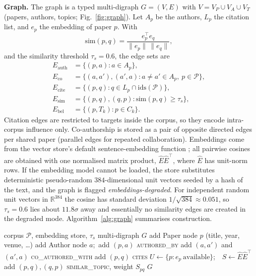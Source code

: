 \documentclass[conference]{IEEEtran}
\newcommand{\cP}{\mathcal{P}}
\begin{document}
\textbf{Graph.} The graph is a typed multi-digraph $G=(V,E)$ with $V=V_P\cup V_A\cup V_T$ (papers, authors, topics; Fig.~\ref{fig:graph}). Let $A_p$ be the authors, $L_p$ the citation list, and $e_p$ the embedding of paper $p$. With
\begin{equation}
\mathrm{sim}(p,q)=\frac{e_p^{\top}e_q}{\lVert e_p\rVert\,\lVert e_q\rVert},
\label{eq:cos}
\end{equation}
and the similarity threshold $\tau_s=0.6$, the edge sets are
\begin{align}
E_{\mathrm{auth}}&=\{(p,a):a\in A_p\},\nonumber\\
E_{\mathrm{co}}&=\{(a,a'),(a',a):a\neq a'\in A_p,\ p\in\cP\},\nonumber\\
E_{\mathrm{cite}}&=\{(p,q):q\in L_p\cap\mathrm{ids}(\cP)\},\nonumber\\
E_{\mathrm{sim}}&=\{(p,q),(q,p):\mathrm{sim}(p,q)\ge\tau_s\},\nonumber\\
E_{\mathrm{bel}}&=\{(p,T_k):p\in C_k\}.
\label{eq:edges}
\end{align}
Citation edges are restricted to targets inside the corpus, so they encode intra-corpus influence only. Co-authorship is stored as a pair of opposite directed edges per shared paper (parallel edges for repeated collaboration). Embeddings come from the vector store's default sentence-embedding function \cite{reimers2019sbert}; all pairwise cosines are obtained with one normalised matrix product, $\hat E\hat E^{\top}$, where $\hat E$ has unit-norm rows. If the embedding model cannot be loaded, the store substitutes deterministic pseudo-random $384$-dimensional unit vectors seeded by a hash of the text, and the graph is flagged \emph{embeddings-degraded}. For independent random unit vectors in $\mathbb{R}^{384}$ the cosine has standard deviation $1/\sqrt{384}\approx0.051$, so $\tau_s=0.6$ lies about $11.8\sigma$ away and essentially no similarity edges are created in the degraded mode. Algorithm~\ref{alg:graph} summarises construction.

\begin{algorithm}[!t]
\caption{Heterogeneous graph construction}
\label{alg:graph}
\small
\begin{algorithmic}[1]
\Require corpus $\cP$, embedding store, $\tau_s$
\Ensure multi-digraph $G$
\ForAll{$p\in\cP$}
  \State add Paper node $p$ (title, year, venue, \dots)
     \State add Author node $a$;\ add $(p,a)$ \textsc{authored\_by}
  \EndFor
     \State add $(a,a')$ and $(a',a)$ \textsc{co\_authored\_with}
  \EndFor
  \ForAll{$q\in L_p$ with $q\in\mathrm{ids}(\cP)$}
     \State add $(p,q)$ \textsc{cites}
  \EndFor
\EndFor
\State $U\gets\{p: e_p\ \text{available}\}$;\ \ $S\gets\hat E\hat E^{\top}$
  \State add $(p,q),(q,p)$ \textsc{similar\_topic}, weight $S_{pq}$
\EndFor
\State \Return $G$
\end{algorithmic}
\end{algorithm}
\end{document}
